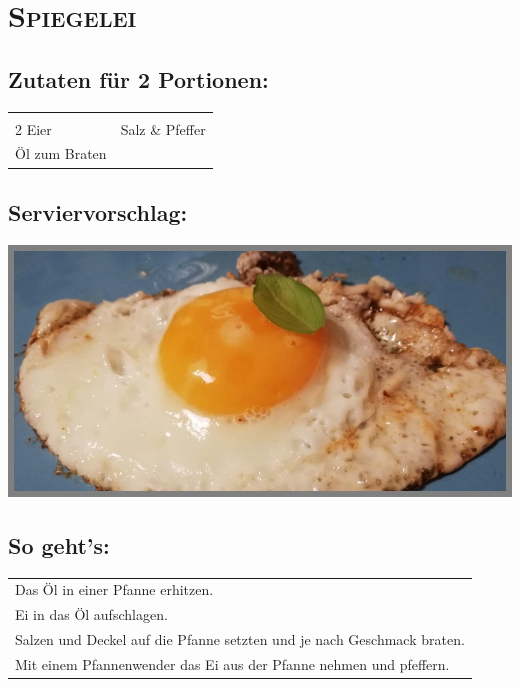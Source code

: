 \section{\textsc{Spiegelei}}

\subsection*{Zutaten für 2 Portionen:}

\begin{tabular}{p{7.5cm} p{7.5cm}}
	& \\
	2 Eier & Salz \& Pfeffer \\
	Öl zum Braten & 
\end{tabular}

\subsection*{Serviervorschlag:}

\includegraphics[width=\textwidth]{img/spiegelei.jpg} \cite{spiegelei}

\subsection*{So geht's:}

\begin{tabular}{p{15cm}}
	\\
	Das Öl in einer Pfanne erhitzen.\\
	Ei in das Öl aufschlagen. \\
	Salzen und Deckel auf die Pfanne setzten und je nach Geschmack braten.\\
	Mit einem Pfannenwender das Ei aus der Pfanne nehmen und pfeffern.
\end{tabular}